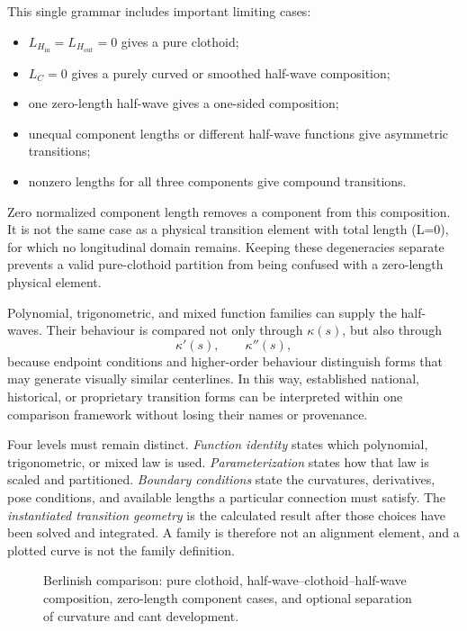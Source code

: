 This single grammar includes important limiting cases:
\begin{itemize}
\item \(L_{H_{\mathrm{in}}}=L_{H_{\mathrm{out}}}=0\) gives a pure clothoid;
\item \(L_C=0\) gives a purely curved or smoothed half-wave composition;
\item one zero-length half-wave gives a one-sided composition;
\item unequal component lengths or different half-wave functions give
asymmetric transitions;
\item nonzero lengths for all three components give compound transitions.
\end{itemize}

Zero normalized component length removes a component from this composition.
It is not the same case as a physical transition element with total length
(L=0), for which no longitudinal domain remains. Keeping these degeneracies
separate prevents a valid pure-clothoid partition from being confused with a
zero-length physical element.

Polynomial, trigonometric, and mixed function families can supply the
half-waves. Their behaviour is compared not only through \(\kappa(s)\), but
also through
\[
\kappa'(s),\qquad \kappa''(s),
\]
because endpoint conditions and higher-order behaviour distinguish forms that
may generate visually similar centerlines. In this way, established national,
historical, or proprietary transition forms can be interpreted within one
comparison framework without losing their names or provenance.

Four levels must remain distinct. \emph{Function identity} states which
polynomial, trigonometric, or mixed law is used. \emph{Parameterization}
states how that law is scaled and partitioned. \emph{Boundary conditions}
state the curvatures, derivatives, pose conditions, and available lengths a
particular connection must satisfy. The \emph{instantiated transition
geometry} is the calculated result after those choices have been solved and
integrated. A family is therefore not an alignment element, and a plotted
curve is not the family definition.

\begin{figure}[ht]
\centering
\resizebox{\textwidth}{!}{}
\caption{Berlinish comparison: pure clothoid, half-wave--clothoid--half-wave composition, zero-length component cases, and optional separation of curvature and cant development.}
\label{fig:berlinish-composition}
\end{figure}

